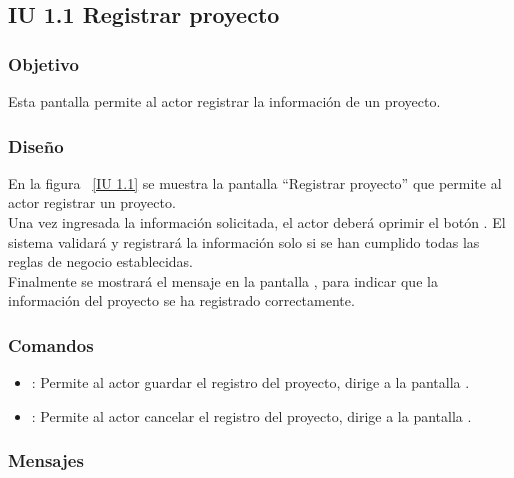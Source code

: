 \subsection{IU 1.1 Registrar proyecto}

\subsubsection{Objetivo}
	
    Esta pantalla permite al actor registrar la información de un proyecto.

\subsubsection{Diseño}

    En la figura ~\ref{IU 1.1} se muestra la pantalla ``Registrar proyecto'' que permite al actor registrar un proyecto. \\
    
    Una vez ingresada la información solicitada, el actor deberá oprimir el botón . El sistema validará y registrará la 
    información solo si se han cumplido todas las reglas de negocio establecidas.  \\
    
    Finalmente se mostrará el mensaje  en la pantalla , 
    para indicar que la información del proyecto
    se ha registrado correctamente.        



\subsubsection{Comandos}
\begin{itemize}
	\item {}: Permite al actor guardar el registro del proyecto, dirige a la pantalla .
	\item {}: Permite al actor cancelar el registro del proyecto, dirige a la pantalla .
\end{itemize}

\subsubsection{Mensajes}
	
